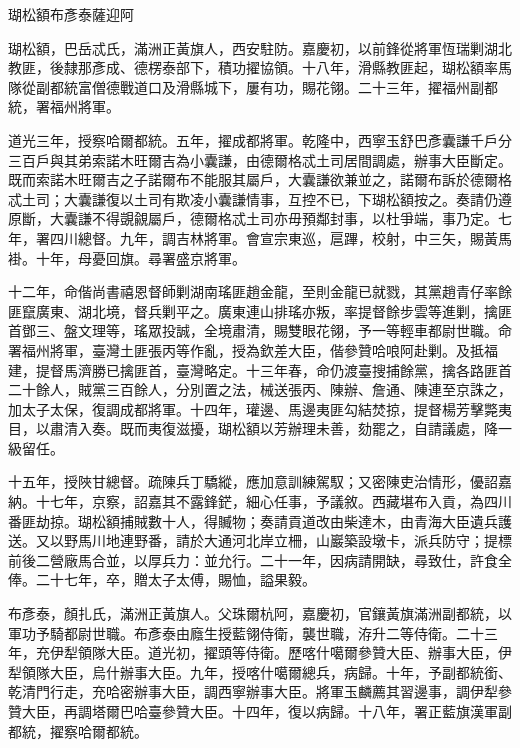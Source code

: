 
\begin{pinyinscope}
瑚松額布彥泰薩迎阿

瑚松額，巴岳忒氏，滿洲正黃旗人，西安駐防。嘉慶初，以前鋒從將軍恆瑞剿湖北教匪，後隸那彥成、德楞泰部下，積功擢協領。十八年，滑縣教匪起，瑚松額率馬隊從副都統富僧德戰道口及滑縣城下，屢有功，賜花翎。二十三年，擢福州副都統，署福州將軍。

道光三年，授察哈爾都統。五年，擢成都將軍。乾隆中，西寧玉舒巴彥囊謙千戶分三百戶與其弟索諾木旺爾吉為小囊謙，由德爾格忒土司居間調處，辦事大臣斷定。既而索諾木旺爾吉之子諾爾布不能服其屬戶，大囊謙欲兼並之，諾爾布訴於德爾格忒土司；大囊謙復以土司有欺凌小囊謙情事，互控不已，下瑚松額按之。奏請仍遵原斷，大囊謙不得覬覦屬戶，德爾格忒土司亦毋預鄰封事，以杜爭端，事乃定。七年，署四川總督。九年，調吉林將軍。會宣宗東巡，扈蹕，校射，中三矢，賜黃馬褂。十年，母憂回旗。尋署盛京將軍。

十二年，命偕尚書禧恩督師剿湖南瑤匪趙金龍，至則金龍已就戮，其黨趙青仔率餘匪竄廣東、湖北境，督兵剿平之。廣東連山排瑤亦叛，率提督餘步雲等進剿，擒匪首鄧三、盤文理等，瑤眾投誠，全境肅清，賜雙眼花翎，予一等輕車都尉世職。命署福州將軍，臺灣土匪張丙等作亂，授為欽差大臣，偕參贊哈哴阿赴剿。及抵福建，提督馬濟勝已擒匪首，臺灣略定。十三年春，命仍渡臺搜捕餘黨，擒各路匪首二十餘人，賊黨三百餘人，分別置之法，械送張丙、陳辦、詹通、陳連至京誅之，加太子太保，復調成都將軍。十四年，瓘邊、馬邊夷匪勾結焚掠，提督楊芳擊斃夷目，以肅清入奏。既而夷復滋擾，瑚松額以芳辦理未善，劾罷之，自請議處，降一級留任。

十五年，授陜甘總督。疏陳兵丁驕縱，應加意訓練駕馭；又密陳吏治情形，優詔嘉納。十七年，京察，詔嘉其不露鋒鋩，細心任事，予議敘。西藏堪布入貢，為四川番匪劫掠。瑚松額捕賊數十人，得贓物；奏請貢道改由柴達木，由青海大臣遺兵護送。又以野馬川地連野番，請於大通河北岸立柵，山巖築設墩卡，派兵防守；提標前後二營廠馬合並，以厚兵力：並允行。二十一年，因病請開缺，尋致仕，許食全俸。二十七年，卒，贈太子太傅，賜恤，謚果毅。

布彥泰，顏扎氏，滿洲正黃旗人。父珠爾杭阿，嘉慶初，官鑲黃旗滿洲副都統，以軍功予騎都尉世職。布彥泰由廕生授藍翎侍衛，襲世職，洊升二等侍衛。二十三年，充伊犁領隊大臣。道光初，擢頭等侍衛。歷喀什噶爾參贊大臣、辦事大臣，伊犁領隊大臣，烏什辦事大臣。九年，授喀什噶爾總兵，病歸。十年，予副都統銜、乾清門行走，充哈密辦事大臣，調西寧辦事大臣。將軍玉麟薦其習邊事，調伊犁參贊大臣，再調塔爾巴哈臺參贊大臣。十四年，復以病歸。十八年，署正藍旗漢軍副都統，擢察哈爾都統。


\end{pinyinscope}
